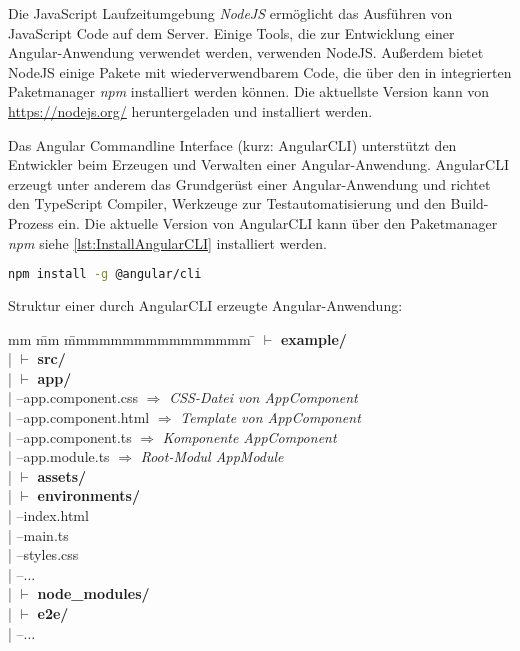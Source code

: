 Die JavaScript Laufzeitumgebung \textit{NodeJS} ermöglicht das Ausführen von JavaScript Code auf dem Server. Einige Tools, die zur Entwicklung einer Angular-Anwendung verwendet werden, verwenden NodeJS. Außerdem bietet NodeJS einige Pakete mit wiederverwendbarem Code, die über den in integrierten Paketmanager \textit{npm} installiert werden können. Die aktuellste Version kann von \url{https://nodejs.org/} heruntergeladen und installiert werden. 

Das Angular Commandline Interface (kurz: AngularCLI) unterstützt den Entwickler beim Erzeugen und Verwalten einer Angular-Anwendung. AngularCLI erzeugt unter anderem  das Grundgerüst einer Angular-Anwendung und richtet den TypeScript Compiler, Werkzeuge zur Testautomatisierung und den Build-Prozess ein. Die aktuelle Version von AngularCLI kann über den Paketmanager \textit{npm} siehe \autoref{lst:InstallAngularCLI} installiert werden. \autocites[vgl.][1\psqq]{Steyer.2017}[vgl.][7\psqq]{Freeman.2018}[vgl.][6\psqq]{Woiwode.2018} 


\begin{lstlisting}[caption=Installation von AngularCLI, label=lst:InstallAngularCLI, language=bash]
npm install -g @angular/cli
\end{lstlisting}

Struktur einer durch AngularCLI erzeugte Angular-Anwendung:

\begin{tabbing}
	mm \= mm \= mmmmmmmmmmmmmmmm \= \kill
	$\vdash$ \textbf{example/} \\ 
	| \> $\vdash$ \textbf{src/}\\ 
	| \> \> $\vdash$  \textbf{app/}\\
	| \> \>  --app.component.css  $\Rightarrow$ \textit{CSS-Datei von AppComponent}\\ 
	| \> \>  --app.component.html  $\Rightarrow$ \textit{Template von AppComponent}\\
	| \> \>  --app.component.ts	 $\Rightarrow$ \textit{Komponente AppComponent}\\
	| \> \>  --app.module.ts  $\Rightarrow$ \textit{Root-Modul AppModule}\\
	| \> \> $\vdash$ \textbf{assets/} \\
	| \> \> $\vdash$ \textbf{environments/} \\
	| \> --index.html\\
	| \> --main.ts\\
	| \> --styles.css \\
	| \> --... \\
	| \> $\vdash$ \textbf{node\_modules/}\\ 
	| \> $\vdash$ \textbf{e2e/}\\   
	| --...\\
\end{tabbing}


